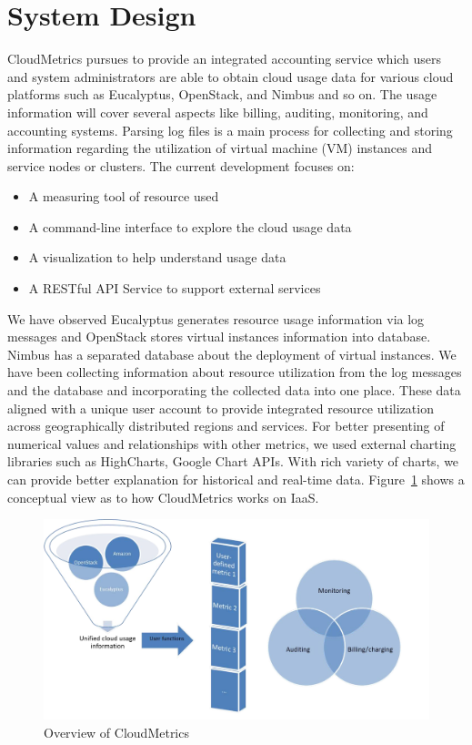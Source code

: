 \documentclass{sig-alternate}
\begin{document}
\section{System Design} \label{S:design}

CloudMetrics pursues to provide an integrated accounting service which users and system administrators are able to obtain cloud usage data for various cloud platforms such as Eucalyptus, OpenStack, and Nimbus and so on. The usage information will cover several aspects like billing, auditing, monitoring, and accounting systems. Parsing log files is a main process for collecting and storing information regarding the utilization of virtual machine (VM) instances and service nodes or clusters. The current development focuses on:

\begin{itemize}
 \item A measuring tool of resource used
 \item A command-line interface to explore the cloud usage data
 \item A visualization to help understand usage data
 \item A RESTful API Service to support external services
\end{itemize}

We have observed Eucalyptus generates resource usage information via log messages and OpenStack stores virtual instances information into database. Nimbus has a separated database about the deployment of virtual instances. We have been collecting information about resource utilization from the log messages and the database and incorporating the collected data into one place. These data aligned with a unique user account to provide integrated resource utilization across geographically distributed regions and services. For better presenting of numerical values and relationships with other metrics, we used external charting libraries such as HighCharts, Google Chart APIs. With rich variety of charts, we can provide better explanation for historical and real-time data. Figure~\ref{F:fig1} shows a conceptual view as to how CloudMetrics works on IaaS.

\begin{figure}[h!] 
  \centering 
    \includegraphics[width=1.0\columnwidth]{images/Picture1.pdf} 
  \caption{Overview of CloudMetrics}\label{F:fig1} 
\end{figure} 
\end{document}
